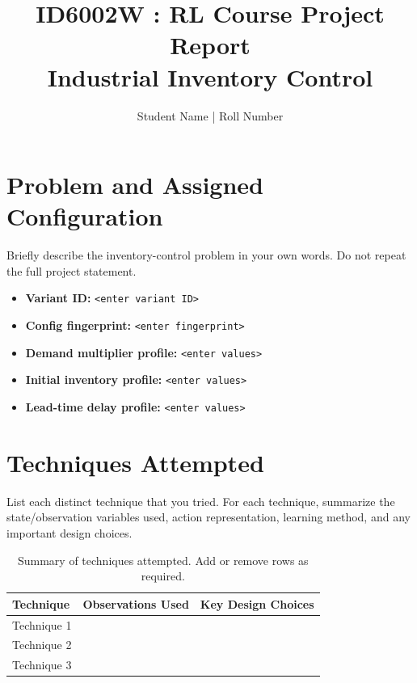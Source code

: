 \documentclass[11pt,a4paper]{article}
\title{\textbf{ID6002W : RL Course Project Report}\\[0.4em]
\large Industrial Inventory Control}
\author{Student Name \quad | \quad Roll Number}
\date{}
\begin{document}
\maketitle

\begin{center}
\end{center}

\section{Problem and Assigned Configuration}

Briefly describe the inventory-control problem in your own words. Do not repeat the full project statement.

\begin{itemize}
    \item \textbf{Variant ID:} \texttt{<enter variant ID>}
    \item \textbf{Config fingerprint:} \texttt{<enter fingerprint>}
    \item \textbf{Demand multiplier profile:} \texttt{<enter values>}
    \item \textbf{Initial inventory profile:} \texttt{<enter values>}
    \item \textbf{Lead-time delay profile:} \texttt{<enter values>}
\end{itemize}

\section{Techniques Attempted}

List each distinct technique that you tried. For each technique, summarize the state/observation variables used, action representation, learning method, and any important design choices.

\begin{table}[H]
\centering
\small
\begin{tabular}{p{}p{}p{}}
\toprule
\textbf{Technique} & \textbf{Observations Used} & \textbf{Key Design Choices} \\
\midrule
Technique 1 &  &    \\
Technique 2 &  &    \\
Technique 3 &  &    \\
\bottomrule
\end{tabular}
\caption{Summary of techniques attempted. Add or remove rows as required.}
\end{table}
\end{document}
